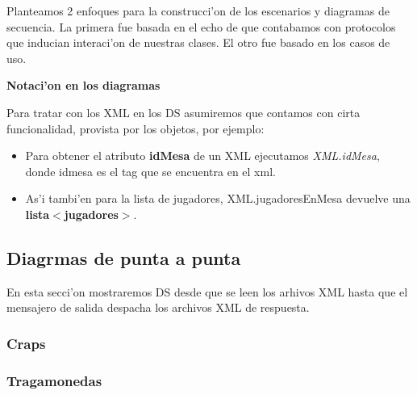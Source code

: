 Planteamos 2 enfoques para la construcci'on de los escenarios y diagramas de secuencia. La primera 
fue basada en el echo de que contabamos con protocolos que inducian interaci'on de
nuestras clases. El otro fue basado en los casos de uso.

\textbf{Notaci'on en los diagramas}

Para tratar con los XML en los DS asumiremos que contamos con cirta funcionalidad, provista por los objetos, por ejemplo:
\begin{itemize}
\item  Para obtener el atributo \textbf{idMesa} de un XML ejecutamos \textit{XML.idMesa}, donde idmesa es el tag que se encuentra en el xml.
\item As'i tambi'en para la lista de jugadores, XML.jugadoresEnMesa devuelve una \textbf{lista$<$jugadores$>$}.
\end{itemize}







\subsection{Diagrmas de punta a punta}
En esta secci'on mostraremos DS desde que se leen los arhivos XML hasta que el mensajero de salida despacha los archivos
XML de respuesta.

\subsubsection{Craps}


\subsubsection{Tragamonedas}



